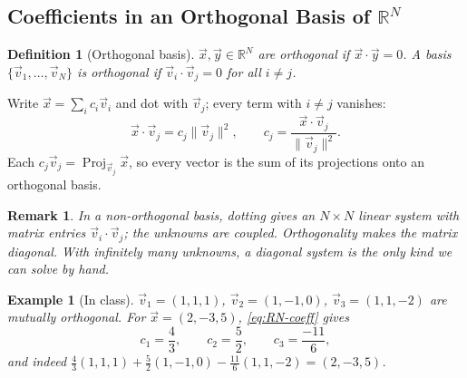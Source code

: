 \documentclass{article}
\newtheorem{definition}{Definition}
\newtheorem*{example}{Example}
\newtheorem{remark}{Remark}
\newcommand{\R}{\mathbb{R}}
\begin{document}
\subsection{Coefficients in an Orthogonal Basis of $\R^N$}
\begin{definition}[Orthogonal basis]
    $\vec{x}, \vec{y} \in \R^N$ are orthogonal if $\vec{x}\cdot\vec{y} = 0$. A basis $\{\vec{v}_1, \dots, \vec{v}_N\}$ is orthogonal if $\vec{v}_i \cdot \vec{v}_j = 0$ for all $i \neq j$.
\end{definition}
Write $\vec{x} = \sum_i c_i\vec{v}_i$ and dot with $\vec{v}_j$; every term with $i \neq j$ vanishes:
\begin{equation}\label{eq:RN-coeff}
    \vec{x}\cdot\vec{v}_j = c_j\|\vec{v}_j\|^2, \qquad c_j = \frac{\vec{x}\cdot\vec{v}_j}{\|\vec{v}_j\|^2}.
\end{equation}
Each $c_j\vec{v}_j = \operatorname{Proj}_{\vec{v}_j}\vec{x}$, so every vector is the sum of its projections onto an orthogonal basis.
\begin{remark}
    In a non-orthogonal basis, dotting gives an $N \times N$ linear system with matrix entries $\vec{v}_i \cdot \vec{v}_j$; the unknowns are coupled. Orthogonality makes the matrix diagonal. With infinitely many unknowns, a diagonal system is the only kind we can solve by hand.
\end{remark}
\begin{example}[In class]
    $\vec{v}_1 = (1,1,1)$, $\vec{v}_2 = (1,-1,0)$, $\vec{v}_3 = (1,1,-2)$ are mutually orthogonal. For $\vec{x} = (2,-3,5)$, \eqref{eq:RN-coeff} gives
    \begin{equation}
        c_1 = \frac{4}{3}, \qquad c_2 = \frac{5}{2}, \qquad c_3 = \frac{-11}{6},
    \end{equation}
    and indeed $\tfrac43(1,1,1) + \tfrac52(1,-1,0) - \tfrac{11}{6}(1,1,-2) = (2,-3,5)$.
\end{example}
\end{document}
